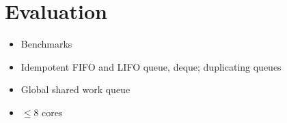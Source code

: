 
\chapter{Evaluation}
\label{chap:queues-evaluation}


\begin{itemize}
\item Benchmarks
\item Idempotent FIFO and LIFO queue, deque; duplicating queues
\item Global shared work queue
\item $\le 8$ cores
\end{itemize}

